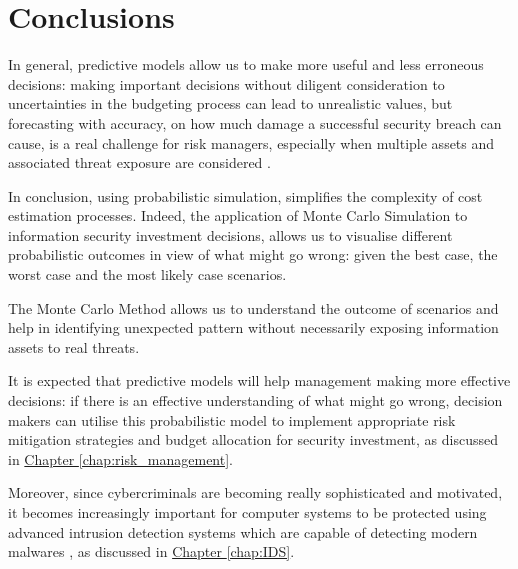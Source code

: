 \section{Conclusions}
\label{chap:conclusions}
In general, predictive models allow us to make more useful and less erroneous decisions: making important decisions without diligent consideration to uncertainties in the budgeting process can lead to unrealistic values, but forecasting with accuracy, on how much damage a successful security breach can cause, is a real challenge for risk managers, especially when multiple assets and associated threat exposure are considered \parencite{Fagade}.

In conclusion, using probabilistic simulation, simplifies the complexity of cost estimation processes.
Indeed, the application of Monte Carlo Simulation to information security investment decisions, allows us to visualise different probabilistic outcomes in view of what might go wrong: given the best case, the worst case and the most likely case scenarios.

The Monte Carlo Method allows us to understand the outcome of scenarios and help in identifying unexpected pattern without necessarily exposing information assets to real threats.

It is expected that predictive models will help management making more effective decisions: if there is an effective understanding of what might go wrong, decision makers can utilise this probabilistic model to implement appropriate risk mitigation strategies and budget allocation for security investment, as discussed in \hyperref[chap:risk_management]{Chapter \ref*{chap:risk_management}}.

Moreover, since cybercriminals are becoming really sophisticated and motivated, it becomes increasingly important for computer systems to be protected using advanced intrusion detection systems which are capable of detecting modern malwares \parencite{Khraisat}, as discussed in \hyperref[chap:IDS]{Chapter \ref*{chap:IDS}}.